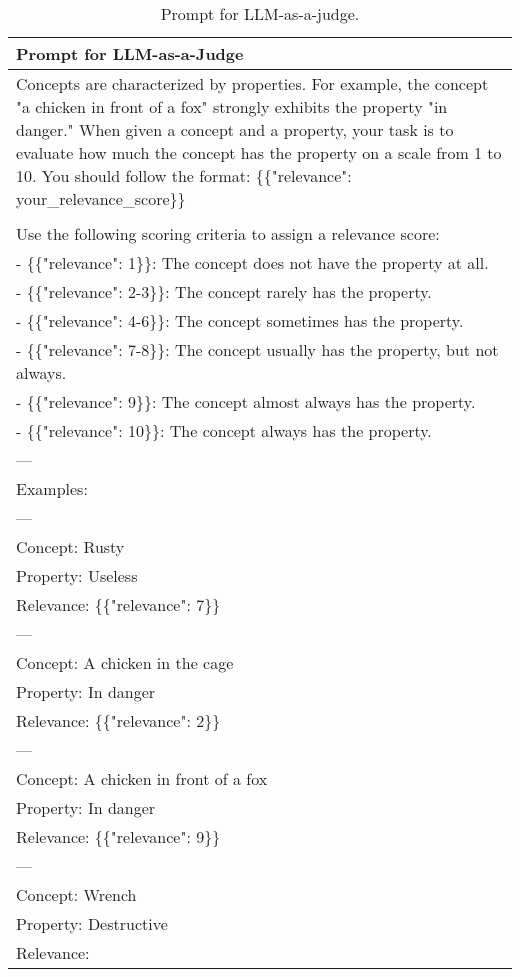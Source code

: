 \begin{table*}[htbp]
\scriptsize
\centering
\begin{tabular}{@{}p{\linewidth}@{}}
\toprule
\textbf{Prompt for LLM-as-a-Judge}\\
\midrule
Concepts are characterized by properties. For example, the concept "a chicken in front of a fox" strongly exhibits the property "in danger." When given a concept and a property, your task is to evaluate how much the concept has the property on a scale from 1 to 10. You should follow the format: \{\{"relevance": your\_relevance\_score\}\}\\
\\
Use the following scoring criteria to assign a relevance score:\\
- \{\{"relevance": 1\}\}: The concept does not have the property at all.\\
- \{\{"relevance": 2-3\}\}: The concept rarely has the property.\\
- \{\{"relevance": 4-6\}\}: The concept sometimes has the property.\\
- \{\{"relevance": 7-8\}\}: The concept usually has the property, but not always.\\
- \{\{"relevance": 9\}\}: The concept almost always has the property.\\
- \{\{"relevance": 10\}\}: The concept always has the property.\\
---\\
Examples:\\
---\\
Concept: Rusty\\
Property: Useless\\
Relevance: \{\{"relevance": 7\}\}\\
---\\
Concept: A chicken in the cage\\
Property: In danger\\
Relevance: \{\{"relevance": 2\}\}\\
---\\
Concept: A chicken in front of a fox\\
Property: In danger\\
Relevance: \{\{"relevance": 9\}\}\\
---\\
Concept: Wrench\\
Property: Destructive\\
Relevance:\\
\bottomrule
\end{tabular}
    \caption{Prompt for LLM-as-a-judge.}
    \label{tab:prompt_judge}
\end{table*}